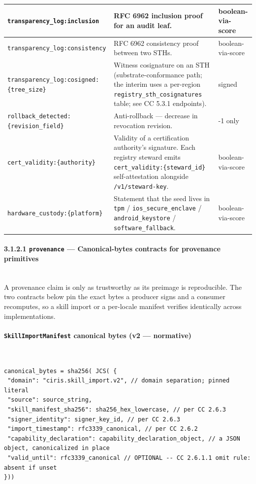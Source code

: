 \documentclass[11pt]{article}
\begin{document}
{\begin{longtable}{|p{5.33cm}|p{5.33cm}|p{5.33cm}|}
\texttt{transparency\_log:inclusion} & RFC 6962 inclusion proof for an audit leaf. & boolean-via-score \\ \hline
\texttt{transparency\_log:consistency} & RFC 6962 consistency proof between two STHs. & boolean-via-score \\ \hline
\texttt{transparency\_log:cosigned:\{tree\_size\}} & Witness cosignature on an STH (substrate-conformance path; the interim uses a per-region \texttt{registry\_sth\_cosignatures} table; see CC 5.3.1 endpoints). & signed \\ \hline
\texttt{rollback\_detected:\{revision\_field\}} & Anti-rollback — decrease in revocation revision. & -1 only \\ \hline
\texttt{cert\_validity:\{authority\}} & Validity of a certification authority's signature. Each registry steward emits \texttt{cert\_validity:\{steward\_id\}} self-attestation alongside \texttt{/v1/steward-key}. & boolean-via-score \\ \hline
\texttt{hardware\_custody:\{platform\}} & Statement that the seed lives in \texttt{tpm} / \texttt{ios\_secure\_enclave} / \texttt{android\_keystore} / \texttt{software\_fallback}. & boolean-via-score \\ \hline
\end{longtable}}


\paragraph{3.1.2.1 \texttt{provenance} — Canonical-bytes contracts for provenance primitives}\mbox{}\\


A provenance claim is only as trustworthy as its preimage is reproducible. The two contracts below pin the exact bytes a producer signs and a consumer recomputes, so a skill import or a per-locale manifest verifies identically across implementations.


\paragraph{\texttt{SkillImportManifest} canonical bytes (v2 — normative)}\mbox{}\\


\begin{lstlisting}
canonical_bytes = sha256( JCS( {
 "domain": "ciris.skill_import.v2", // domain separation; pinned literal
 "source": source_string,
 "skill_manifest_sha256": sha256_hex_lowercase, // per CC 2.6.3
 "signer_identity": signer_key_id, // per CC 2.6.3
 "import_timestamp": rfc3339_canonical, // per CC 2.6.2
 "capability_declaration": capability_declaration_object, // a JSON object, canonicalized in place
 "valid_until": rfc3339_canonical // OPTIONAL -- CC 2.6.1.1 omit rule: absent if unset
}))
\end{lstlisting}
\end{document}
